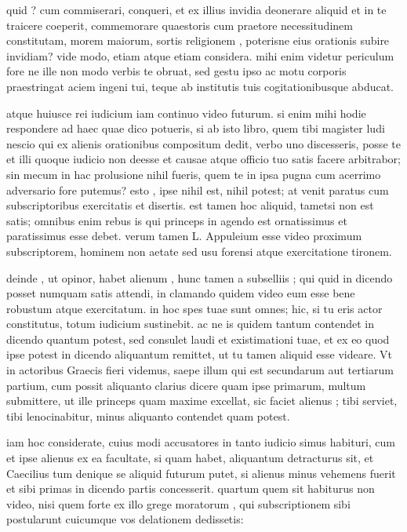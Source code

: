  quid ? cum commiserari, conqueri, et ex illius invidia deonerare aliquid et in te traicere coeperit, commemorare quaestoris cum praetore necessitudinem constitutam, morem maiorum, sortis religionem , poterisne eius orationis subire invidiam? vide modo, etiam atque etiam considera. mihi enim videtur periculum fore ne ille non modo verbis te obruat, sed gestu ipso ac motu corporis praestringat aciem ingeni tui, teque ab institutis tuis cogitationibusque abducat.

 atque huiusce rei iudicium iam continuo video futurum. si enim mihi hodie respondere ad haec quae dico potueris, si ab isto libro, quem tibi magister ludi nescio qui ex alienis orationibus compositum dedit, verbo uno discesseris, posse te et illi quoque iudicio non deesse et causae atque officio tuo satis facere arbitrabor; sin mecum in hac prolusione nihil fueris, quem te in ipsa pugna cum acerrimo adversario fore putemus? esto , ipse nihil est, nihil potest; at venit paratus cum subscriptoribus exercitatis et disertis. est tamen hoc aliquid, tametsi non est satis; omnibus enim rebus is qui princeps in agendo est ornatissimus et paratissimus esse debet. verum tamen L. Appuleium esse video proximum subscriptorem, hominem non aetate sed usu forensi atque exercitatione tironem.

 deinde , ut opinor, habet alienum , hunc tamen a subselliis ; qui quid in dicendo posset numquam satis attendi, in clamando quidem video eum esse bene robustum atque exercitatum. in hoc spes tuae sunt omnes; hic, si tu eris actor constitutus, totum iudicium sustinebit. ac ne is quidem tantum contendet in dicendo quantum potest, sed consulet laudi et existimationi tuae, et ex eo quod ipse potest in dicendo aliquantum remittet, ut tu tamen aliquid esse videare. Vt in actoribus Graecis fieri videmus, saepe illum qui est secundarum aut tertiarum partium, cum possit aliquanto clarius dicere quam ipse primarum, multum submittere, ut ille princeps quam maxime excellat, sic faciet alienus ; tibi serviet, tibi lenocinabitur, minus aliquanto contendet quam potest.

 iam hoc considerate, cuius modi accusatores in tanto iudicio simus habituri, cum et ipse alienus ex ea facultate, si quam habet, aliquantum detracturus sit, et Caecilius tum denique se aliquid futurum putet, si alienus minus vehemens fuerit et sibi primas in dicendo partis concesserit. quartum quem sit habiturus non video, nisi quem forte ex illo grege moratorum , qui subscriptionem sibi postularunt cuicumque vos delationem dedissetis:

